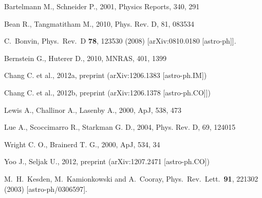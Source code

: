 \documentclass[useAMS,fleqn,usenatbib]{mn2e}
\begin{document}
%
\begin{thebibliography}{}

  Bartelmann M., Schneider P., 2001, Physics Reports, 340, 291
 
  
  Bean R., Tangmatitham M., 2010, Phys. Rev. D, 81, 083534
  
  C.~Bonvin,
  Phys.\ Rev.\ D {\bf 78}, 123530 (2008)
  [arXiv:0810.0180 [astro-ph]].


  Bernstein G., Huterer D., 2010, MNRAS, 401, 1399 


  Chang C. et al., 2012a, preprint (arXiv:1206.1383 [astro-ph.IM])
  
  Chang C. et al., 2012b, preprint (arXiv:1206.1378 [astro-ph.CO]])

     Lewis A., Challinor A., Lasenby A., 2000, ApJ, 538, 473
  
  Lue A., Scoccimarro R., Starkman G. D., 2004, Phys. Rev. D, 69, 124015
  
  Wright C. O., Brainerd T. G., 2000, ApJ, 534, 34
  
  
  Yoo J., Seljak U., 2012, preprint (arXiv:1207.2471 [astro-ph.CO])

  M.~H.~Kesden, M.~Kamionkowski and A.~Cooray,
  Phys.\ Rev.\ Lett.\  {\bf 91}, 221302 (2003)
  [astro-ph/0306597].
  
  

\end{thebibliography}
\end{document}

